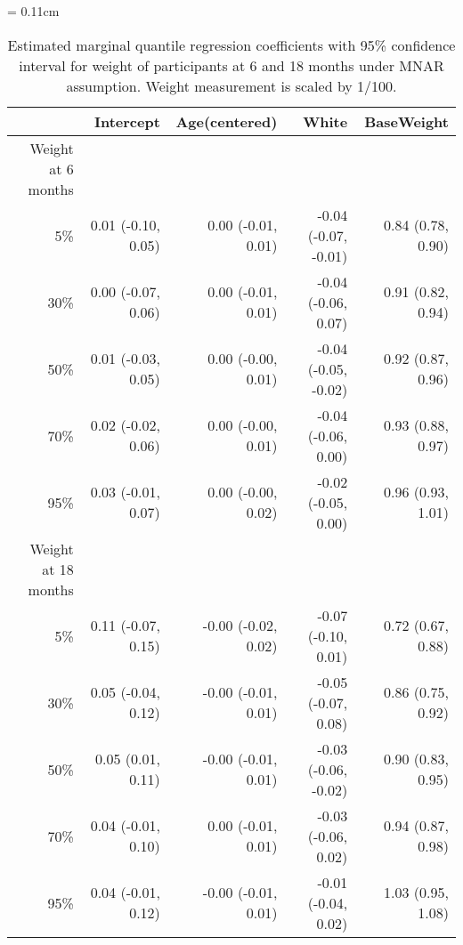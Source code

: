 \documentclass[12pt]{article}
\begin{document}
\begin{table}
  \renewcommand{\arraystretch}{1.3}
  \begin{center}
    \caption{Estimated marginal quantile regression coefficients with
      95\% confidence interval for weight of participants at 6 and 18
      months under MNAR assumption. Weight measurement is scaled by
      1/100.}\label{tab:toursmnar}
    \vspace{10pt} \tabcolsep = 0.11cm
    \begin{tabular}{rrrrr}
      \toprule
      & Intercept          & Age(centered)       & White                & BaseWeight        \\
      \hline
      Weight at 6 months                                                                         \\
      5\%  & 0.01 (-0.10, 0.05) & 0.00 (-0.01, 0.01)  & -0.04 (-0.07, -0.01) & 0.84 (0.78, 0.90) \\
      30\% & 0.00 (-0.07, 0.06) & 0.00 (-0.01, 0.01)  & -0.04 (-0.06, 0.07)  & 0.91 (0.82, 0.94) \\
      50\% & 0.01 (-0.03, 0.05) & 0.00 (-0.00, 0.01)  & -0.04 (-0.05, -0.02) & 0.92 (0.87, 0.96) \\
      70\% & 0.02 (-0.02, 0.06) & 0.00 (-0.00, 0.01)  & -0.04 (-0.06, 0.00)  & 0.93 (0.88, 0.97) \\
      95\% & 0.03 (-0.01, 0.07) & 0.00 (-0.00, 0.02)  & -0.02 (-0.05, 0.00)  & 0.96 (0.93, 1.01) \\
      Weight at 18 months                                                                        \\
      5\%  & 0.11 (-0.07, 0.15) & -0.00 (-0.02, 0.02) & -0.07 (-0.10, 0.01)  & 0.72 (0.67, 0.88) \\
      30\% & 0.05 (-0.04, 0.12) & -0.00 (-0.01, 0.01) & -0.05 (-0.07, 0.08)  & 0.86 (0.75, 0.92) \\
      50\% & 0.05 (0.01, 0.11)  & -0.00 (-0.01, 0.01) & -0.03 (-0.06, -0.02) & 0.90 (0.83, 0.95) \\
      70\% & 0.04 (-0.01, 0.10) & 0.00 (-0.01, 0.01)  & -0.03 (-0.06, 0.02)  & 0.94 (0.87, 0.98) \\
      95\% & 0.04 (-0.01, 0.12) & -0.00 (-0.01, 0.01) & -0.01 (-0.04, 0.02)  & 1.03 (0.95, 1.08) \\
      \bottomrule
    \end{tabular}
  \end{center}
\end{table}
\end{document}

